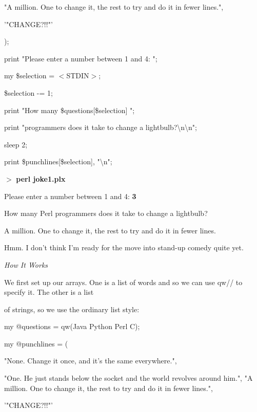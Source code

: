 \documentclass[a4paper,11pt]{book}
\begin{document}
\noindent "A million. One to change it, the rest to try and do it in fewer lines.",

\noindent '"CHANGE?!!"'

\noindent );

\noindent 

\noindent print "Please enter a number between 1 and 4: ";

\noindent my \$selection = $<$STDIN$>$;

\noindent \$selection -= 1;

\noindent print "How many \$questions[\$selection] ";

\noindent print "programmers does it take to change a lightbulb?\textbackslash n\textbackslash n";

\noindent sleep 2;

\noindent print \$punchlines[\$selection], "\textbackslash n";

\noindent 

\noindent $>$ \textbf{perl joke1.plx}

\noindent Please enter a number between 1 and 4: \textbf{3}

\noindent How many Perl programmers does it take to change a lightbulb?

\noindent 

\noindent A million. One to change it, the rest to try and do it in fewer lines.

\noindent 

\noindent Hmm. I don't think I'm ready for the move into stand-up comedy quite yet.

\noindent 

\noindent \textit{How It Works}

\noindent We first set up our arrays. One is a list of words and so we can use qw// to specify it. The other is a list

\noindent of strings, so we use the ordinary list style:

\noindent 

\noindent my @questions = qw(Java Python Perl C);

\noindent my @punchlines = (

\noindent "None. Change it once, and it's the same everywhere.",

\noindent "One. He just stands below the socket and the world revolves around him.", "A million. One to change it, the rest to try and do it in fewer lines.",

\noindent '"CHANGE?!!"'
\end{document}

